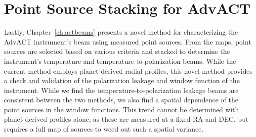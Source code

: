 \section{Point Source Stacking for AdvACT}
Lastly, Chapter~\ref{ch:actbeams} presents a novel method for characterizing the AdvACT instrument's beam using measured point sources. 
 From the maps, point sources are selected based on various criteria and stacked to determine the instrument's temperature and temperature-to-polarization beams.  While the current method employs planet-derived radial profiles, this novel method provides a check and validation of the polarization leakage and window function of the instrument.  While we find the temperature-to-polarization leakage beams are consistent between the two methods, we also find a spatial dependence of the point sources in the window functions. This trend cannot be determined with planet-derived profiles alone, as these are measured at a fixed RA and DEC, but requires a full map of sources to weed out such a spatial variance.